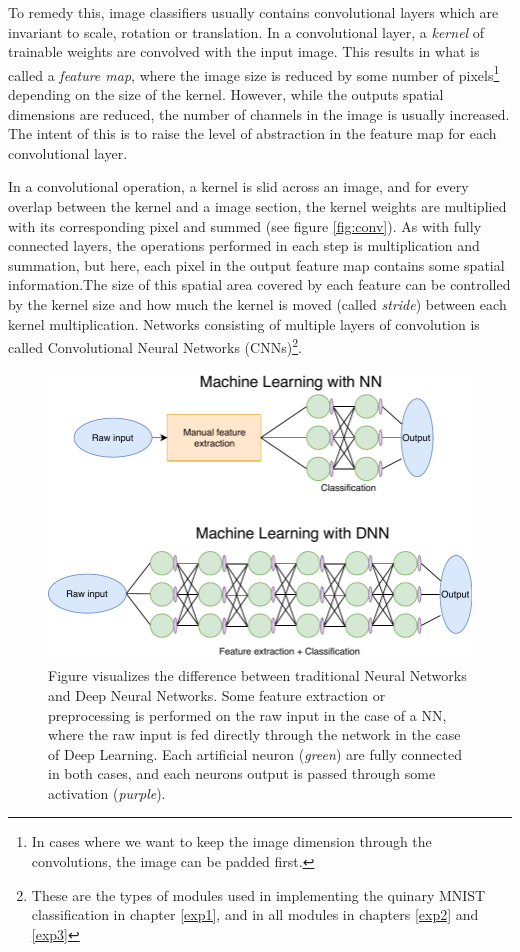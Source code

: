 To remedy this, image classifiers usually contains convolutional layers which are invariant to scale, rotation or translation. In a convolutional layer, a \textit{kernel} of trainable weights are convolved with the input image. This results in what is called a \textit{feature map}, where the image size is reduced by some number of pixels\footnote{In cases where we want to keep the image dimension through the convolutions, the image can be padded first.} depending on the size of the kernel. However, while the outputs spatial dimensions are reduced, the number of channels in the image is usually increased. The intent of this is to raise the level of abstraction in the feature map for each convolutional layer. 

In a convolutional operation, a kernel is slid across an image, and for every overlap between the kernel and a image section, the kernel weights are multiplied with its corresponding pixel and summed (see figure \ref{fig:conv}). As with fully connected layers, the operations performed in each step is multiplication and summation, but here, each pixel in the output feature map contains some spatial information.The size of this spatial area covered by each feature can be controlled by the kernel size and how much the kernel is moved (called \textit{stride}) between each kernel multiplication.
Networks consisting of multiple layers of convolution is called Convolutional Neural Networks (CNNs)\footnote{These are the types of modules used in implementing the quinary MNIST classification in chapter \ref{exp1}, and in all modules in chapters \ref{exp2} and \ref{exp3}}.

\begin{figure}[ht] 
    \centering
    \includegraphics[width=\linewidth]{Chapters/2.Background/figures/NNvsDNN_NY.pdf}
    \caption[NN vs DNN]{Figure visualizes the difference between traditional Neural Networks and Deep Neural Networks. Some feature extraction or preprocessing  is performed on the raw input in the case of a NN, where the raw input is fed directly through the network in the case of Deep Learning. Each artificial neuron (\textit{green}) are fully connected in both cases, and each neurons output is passed through some activation (\textit{purple}).}
    \label{fig:NNvsDNN}
\end{figure}

